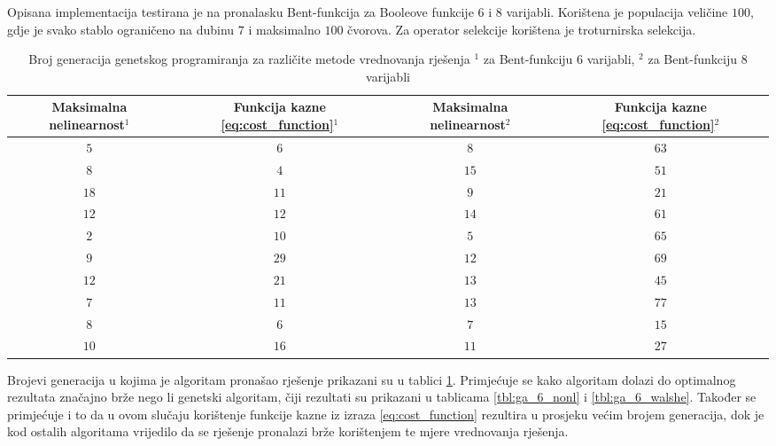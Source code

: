 Opisana implementacija testirana je na pronalasku Bent-funkcija za Booleove funkcije $6$ i $8$ varijabli.
Korištena je populacija veličine $100$, gdje je svako stablo ograničeno na dubinu $7$ i maksimalno $100$ čvorova.
Za operator selekcije korištena je troturnirska selekcija.
\begin{table}[]
    \centering
    \begin{tabular}{cccc}
        \makecell{Maksimalna \\ nelinearnost$^1$} & \makecell{Funkcija \\ kazne \eqref{eq:cost_function}$^1$} & \makecell{Maksimalna \\ nelinearnost$^2$} & \makecell{Funkcija \\ kazne \eqref{eq:cost_function}$^2$} \\ \hline
         $5$ &  $6$ &  $8$ & $63$ \\
         $8$ &  $4$ & $15$ & $51$ \\
        $18$ & $11$ &  $9$ & $21$ \\
        $12$ & $12$ & $14$ & $61$ \\
         $2$ & $10$ &  $5$ & $65$ \\
         $9$ & $29$ & $12$ & $69$ \\
        $12$ & $21$ & $13$ & $45$ \\
         $7$ & $11$ & $13$ & $77$ \\
         $8$ &  $6$ &  $7$ & $15$ \\
        $10$ & $16$ & $11$ & $27$
    \end{tabular}
    \captionsetup{justification=centering}
    \caption{Broj generacija genetskog programiranja za različite metode vrednovanja rješenja \newline
    \footnotesize{$^1$ za Bent-funkciju $6$ varijabli, $^2$ za Bent-funkciju $8$ varijabli}}
    \label{tbl:gp_6_8}
\end{table}
Brojevi generacija u kojima je algoritam pronašao rješenje prikazani su u tablici \ref{tbl:gp_6_8}.
Primjećuje se kako algoritam dolazi do optimalnog rezultata značajno brže nego li genetski algoritam, čiji rezultati su prikazani u tablicama \ref{tbl:ga_6_nonl} i \ref{tbl:ga_6_walshe}.
Također se primjećuje i to da u ovom slučaju korištenje funkcije kazne iz izraza \eqref{eq:cost_function} rezultira u prosjeku većim brojem generacija, dok je kod ostalih algoritama vrijedilo da se rješenje pronalazi brže korištenjem te mjere vrednovanja rješenja.

